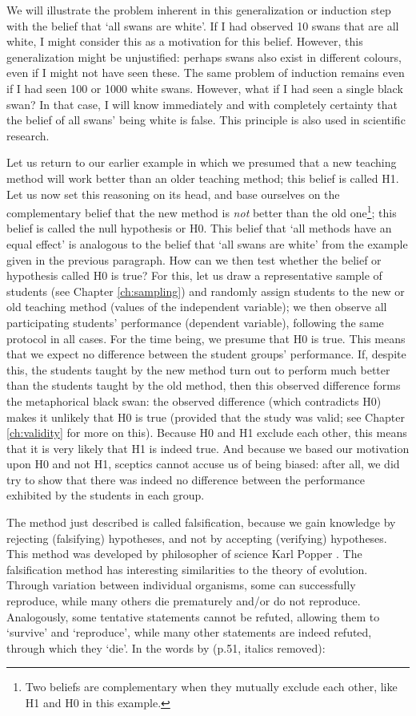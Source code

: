 \documentclass[
]{book}
\begin{document}
We will illustrate the problem inherent in this generalization or induction step with the belief that `all swans are white'. If I had observed 10 swans that are all white, I might consider this as a motivation for this belief. However, this generalization might be unjustified: perhaps swans also exist in different colours, even if I might not have seen these. The same problem of induction remains even if I had seen 100 or 1000 white swans. However, what if I had seen a single black swan? In that case, I will know immediately and with completely certainty that the belief of all swans' being white is false. This principle is also used in scientific research.

Let us return to our earlier example in which we presumed that a new teaching method will work better than an older teaching method; this belief is called H1. Let us now set this reasoning on its head, and base ourselves on the complementary belief that the new method is \emph{not} better than the old one\footnote{Two beliefs are complementary when they mutually exclude each other, like H1 and H0 in this example.}; this belief is called the null hypothesis or H0. This belief that `all methods have an equal effect' is analogous to the belief that `all swans are white' from the example given in the previous paragraph. How can we then test whether the belief or hypothesis called H0 is true? For this, let us draw a representative sample of students (see Chapter \ref{ch:sampling}) and randomly assign students to the new or old teaching method (values of the independent variable); we then observe all participating students' performance (dependent variable), following the same protocol in all cases. For the time being, we presume that H0 is true. This means that we expect no difference between the student groups' performance. If, despite this, the students taught by the new method turn out to perform much better than the students taught by the old method, then this observed difference forms the metaphorical black swan: the observed difference (which contradicts H0) makes it unlikely that H0 is true (provided that the study was valid; see Chapter \ref{ch:validity} for more on this). Because H0 and H1 exclude each other, this means that it is very likely that H1 is indeed true. And because we based our motivation upon H0 and not H1, sceptics cannot accuse us of being biased: after all, we did try to show that there was indeed no difference between the performance exhibited by the students in each group.

The method just described is called falsification, because we gain knowledge by rejecting (falsifying) hypotheses, and not by accepting (verifying) hypotheses. This method was developed by philosopher of science Karl Popper \citep{Popp35, Popp59, Popp63}. The falsification method has interesting similarities to the theory of evolution. Through variation between individual organisms, some can successfully reproduce, while many others die prematurely and/or do not reproduce. Analogously, some tentative statements cannot be refuted, allowing them to `survive' and `reproduce', while many other statements are indeed refuted, through which they `die'. In the words by \citet{Popp63} (p.51, italics removed):
\end{document}
